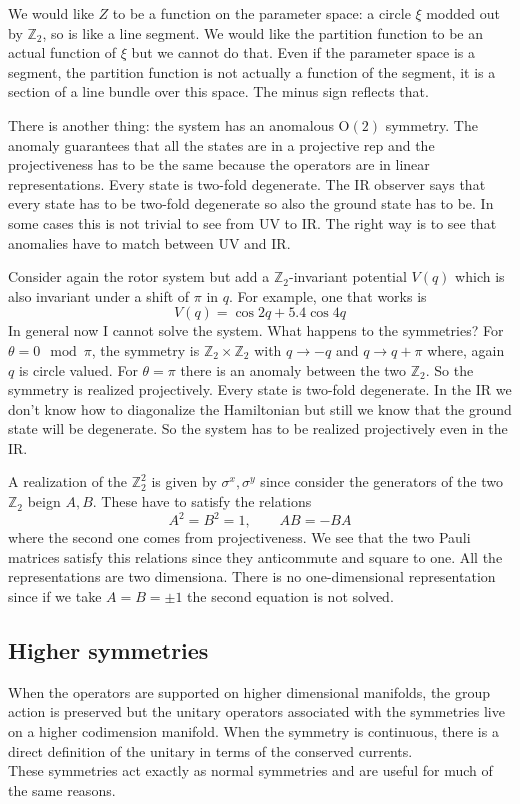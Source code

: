 \documentclass[11pt]{article}
\theoremstyle{definition}
\numberwithin{equation}{section}
\newcommand*\bbZ{\mathbb{Z}}
\newcommand*\OO{\mathrm{O}}
\begin{document}
We would like $Z$ to be a function on the parameter space: a circle $\xi$ modded out by $\bbZ_{2}$, so is like a line segment. We would like the partition function to be an actual function of $\xi$ but we cannot do that. Even if the parameter space is a segment, the partition function is not actually a function of the segment, it is a section of a line bundle over this space. The minus sign reflects that.

There is another thing: the system has an anomalous $\OO(2)$ symmetry. The anomaly guarantees that all the states are in a projective rep and the projectiveness has to be the same because the operators are in linear representations. Every state is two-fold degenerate. The IR observer says that every state has to be two-fold degenerate so also the ground state has to be. In some cases this is not trivial to see from UV to IR. The right way is to see that anomalies have to match between UV and IR.

Consider again the rotor system but add a $\bbZ_{2}$-invariant potential $V(q)$ which is also invariant under a shift of $\pi$ in $q$. For example, one that works is
\begin{equation}
	V(q)=\cos 2q+5.4\cos 4q
\end{equation}
In general now I cannot solve the system. What happens to the symmetries? For $\theta=0 \mod \pi$, the symmetry is $\bbZ_{2}\times\bbZ_{2}$ with $q\rightarrow -q$ and $q\rightarrow q+\pi$ where, again $q$ is circle valued. For $\theta=\pi$ there is an anomaly between the two $\bbZ_{2}$. So the symmetry is realized projectively. Every state is two-fold degenerate. In the IR we don't know how to diagonalize the Hamiltonian but still we know that the ground state will be degenerate. So the system has to be realized projectively even in the IR.

A realization of the $\bbZ_{2}^{2}$ is given by $\sigma^{x},\sigma^{y}$ since consider the generators of the two $\bbZ_{2}$ beign $A,B$. These have to satisfy the relations
\begin{equation}
	A^{2}=B^{2}=1,\qquad AB=-BA
\end{equation}
where the second one comes from projectiveness. We see that the two Pauli matrices satisfy this relations since they anticommute and square to one. All the representations are two dimensiona. There is no one-dimensional representation since if we take $A=B=\pm1$ the second equation is not solved.

\subsection{Higher symmetries}
When the operators are supported on higher dimensional manifolds, the group action is preserved but the unitary operators associated with the symmetries live on a higher codimension manifold. When the symmetry is continuous, there is a direct definition of the unitary in terms of the conserved currents.\\
These symmetries act exactly as normal symmetries and are useful for much of the same reasons.
\end{document}
